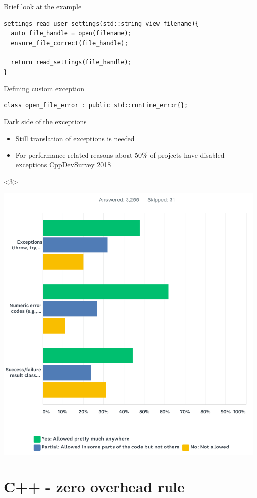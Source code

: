 \documentclass[10pt]{beamer}
\begin{document}
\begin{frame}[fragile]{Brief look at the example}
	\begin{verbatim}
settings read_user_settings(std::string_view filename){
  auto file_handle = open(filename);
  ensure_file_correct(file_handle);

  return read_settings(file_handle);
}
	\end{verbatim}
\end{frame}

\begin{frame}[fragile]{Defining custom exception}
	\begin{verbatim}
class open_file_error : public std::runtime_error{};
	\end{verbatim}
\end{frame}

\begin{frame}[fragile]{Dark side of the exceptions}
	\begin{itemize}[<+- | alert@+>]
		\item Still translation of exceptions is needed
		\item For performance related reasons about 50\% of projects have disabled exceptions \tiny{CppDevSurvey 2018}\\
	\end{itemize}
	\begin{uncoverenv}
	\begin{center}
		\centering \includegraphics[width=.45\linewidth]{survey_results.png}
	\end{center}
	\end{uncoverenv}
	
\end{frame}

\section{C++ - zero overhead rule}
\end{document}
